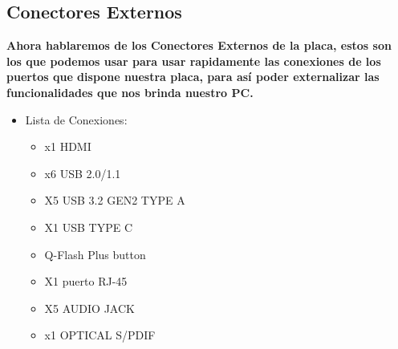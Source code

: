 \documentclass{article}
\begin{document}
    \subsection{Conectores Externos}
      \normalsize
        {\bfseries Ahora hablaremos de los \textbf{Conectores Externos} de la placa, estos son los que podemos usar para usar rapidamente las conexiones de los puertos que dispone nuestra placa, para así poder 
        externalizar las funcionalidades que nos brinda nuestro PC. }%
        \begin{itemize}
          \item Lista de Conexiones:

          \begin{minipage}{0.5\textwidth}
            \begin{itemize}%
              \item x1 HDMI
              \item x6 USB 2.0/1.1
              \item X5 USB 3.2 GEN2 TYPE A
              \item X1 USB TYPE C
              \item Q-Flash Plus button
              \item X1 puerto RJ-45
              \item X5 AUDIO JACK 
              \item x1 OPTICAL S/PDIF 
            \end{itemize}
          \end{minipage}
          \begin{minipage}{\textwidth}

\end{minipage}
\end{itemize}
\end{document}

